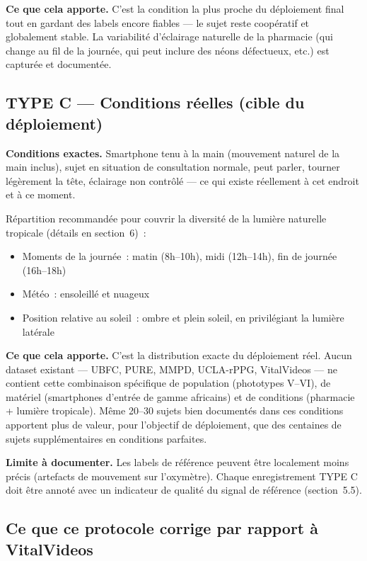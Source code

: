 \documentclass[11pt,a4paper]{article}
\begin{document}
\textbf{Ce que cela apporte.} C'est la condition la plus proche du
d\'eploiement final tout en gardant des labels encore fiables --- le sujet
reste coop\'eratif et globalement stable. La variabilit\'e d'\'eclairage
naturelle de la pharmacie (qui change au fil de la journ\'ee, qui peut
inclure des n\'eons d\'efectueux, etc.) est captur\'ee et document\'ee.

\subsection{TYPE C --- Conditions r\'eelles (cible du d\'eploiement)}

\textbf{Conditions exactes.} Smartphone tenu \`a la main (mouvement naturel
de la main inclus), sujet en situation de consultation normale, peut parler,
tourner l\'eg\`erement la t\^ete, \'eclairage non contr\^ol\'e --- ce qui
existe r\'eellement \`a cet endroit et \`a ce moment.

R\'epartition recommand\'ee pour couvrir la diversit\'e de la lumi\`ere
naturelle tropicale (d\'etails en section~6)~:
\begin{itemize}
\item Moments de la journ\'ee~: matin (8h--10h), midi (12h--14h), fin de
journ\'ee (16h--18h)
\item M\'et\'eo~: ensoleill\'e et nuageux
\item Position relative au soleil~: ombre et plein soleil, en privil\'egiant
la lumi\`ere lat\'erale
\end{itemize}

\textbf{Ce que cela apporte.} C'est la distribution exacte du d\'eploiement
r\'eel. Aucun dataset existant --- UBFC, PURE, MMPD, UCLA-rPPG, VitalVideos
--- ne contient cette combinaison sp\'ecifique de population (phototypes
V--VI), de mat\'eriel (smartphones d'entr\'ee de gamme africains) et de
conditions (pharmacie + lumi\`ere tropicale). M\^eme 20--30 sujets bien
document\'es dans ces conditions apportent plus de valeur, pour l'objectif
de d\'eploiement, que des centaines de sujets suppl\'ementaires en
conditions parfaites.

\textbf{Limite \`a documenter.} Les labels de r\'ef\'erence peuvent \^etre
localement moins pr\'ecis (artefacts de mouvement sur l'oxym\`etre). Chaque
enregistrement TYPE C doit \^etre annot\'e avec un indicateur de qualit\'e
du signal de r\'ef\'erence (section~5.5).

\subsection{Ce que ce protocole corrige par rapport \`a VitalVideos}
\end{document}
